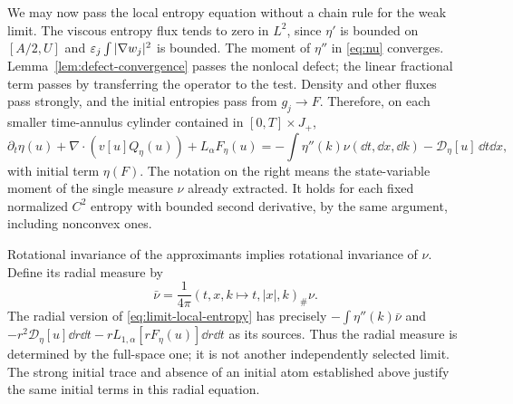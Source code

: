 We may now pass the local entropy equation without a chain rule for the
weak limit. The viscous entropy flux tends to zero in $L^2$, since
$\eta'$ is bounded on $[A/2,U]$ and
$\varepsilon_j\int|\nabla w_j|^2$ is bounded. The moment of $\eta''$ in
\eqref{eq:nu} converges. Lemma~\ref{lem:defect-convergence} passes the
nonlocal defect; the linear fractional term passes by transferring the
operator to the test. Density and other fluxes pass strongly, and the
initial entropies pass from $g_j\to F$. Therefore, on each smaller
time-annulus cylinder contained in $[0,T]\times J_+$,
\begin{equation}\label{eq:limit-local-entropy}
 \partial_t\eta(u)+\nabla\cdot(v[u]Q_\eta(u))+L_\alpha F_\eta(u)
 =-\int\eta''(k)\nu(\dd t,\dd x,\dd k)
   -\mathcal D_\eta[u]\,\dd t\dd x,
\end{equation}
with initial term $\eta(F)$. The notation on the right means the
state-variable moment of the single measure $\nu$ already extracted.
It holds for each fixed normalized $C^2$ entropy with bounded second
derivative, by the same argument, including nonconvex ones.

Rotational invariance of the approximants implies rotational invariance
of $\nu$. Define its radial measure by
\begin{equation}\label{eq:radial-nu}
 \bar\nu=\frac1{4\pi}(t,x,k\mapsto t,|x|,k)_\#\nu.
\end{equation}
The radial version of \eqref{eq:limit-local-entropy} has precisely
$-\int\eta''(k)\bar\nu$ and
$-r^2\mathcal D_\eta[u]\dd r\dd t-rL_{1,\alpha}[rF_\eta(u)]\dd r\dd t$
as its sources. Thus the radial measure is determined by the full-space
one; it is not another independently selected limit. The strong initial
trace and absence of an initial atom established above justify the same
initial terms in this radial equation.
